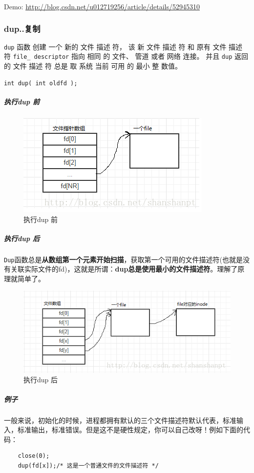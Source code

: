 \documentclass[UTF8,a4paper,8pt]{ctexbook}
\begin{document}
				Demo: \url{http://blog.csdn.net/u012719256/article/details/52945310}
				
			\subsubsection{dup..复制}\verb|dup| 函数 创建 一个 新的 文件 描述 符， 该 新 文件 描述 符 和 原有 文件 描述 符 \verb|file_ descriptor| 指向 相同 的 文件、 管道 或者 网络 连接。 并且 \verb|dup| 返回 的 文件 描述 符 总是 取 系统 当前 可用 的 最小 整 数值。
			
				\verb|int dup( int oldfd ); |
				\subparagraph{执行dup 前}
				
					\begin{figure}[h]
						\centering
						\includegraphics*[scale = 0.8]{orgi.png}
						\caption{执行dup 前}
					\end{figure}
				
				\subparagraph{执行dup 后}
					\verb|Dup|函数总是\textbf{从数组第一个元素开始扫描}，获取第一个可用的文件描述符(也就是没有关联实际文件的fd)，这就是所谓：\textbf{dup总是使用最小的文件描述符}。理解了原理就简单了。
					
					\begin{figure}[h]
						\centering
						\includegraphics*[scale = 0.8]{after.png}
						\caption{执行dup 后}
					\end{figure}
					
				\subparagraph{例子}一般来说，初始化的时候，进程都拥有默认的三个文件描述符默认代表，标准输入，标准输出，标准错误。但是这不是硬性规定，你可以自己改呀！例如下面的代码：
					\begin{lstlisting}
	close(0);
	dup(fd[x]);/* 这是一个普通文件的文件描述符 */
					\end{lstlisting}	
			
\end{document}
